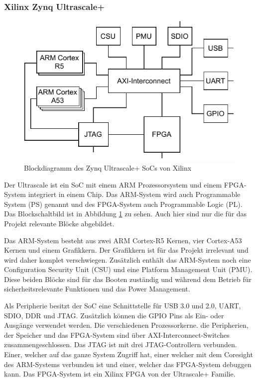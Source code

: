 \documentclass{article}
\begin{document}
\subsubsection*{Xilinx Zynq Ultrascale+}
\begin{figure}[tb]
    \includegraphics[width=\linewidth]{drawio/bd_soc}
    \caption{Blockdiagramm des Zynq Ultrascale+ SoCs von Xilinx}
    \label{fig:bd_soc}
\end{figure}

Der Ultrascale ist ein SoC mit einem ARM Prozessorsystem und einem FPGA-System integriert in einem Chip. Das ARM-System wird auch Programmable System (PS) genannt und des FPGA-System auch Programmable Logic (PL). Das Blockschaltbild ist in Abbildung \ref{fig:bd_soc} zu sehen. Auch hier sind nur die für das Projekt relevante Blöcke abgebildet. 

Das ARM-System besteht aus zwei ARM Cortex-R5 Kernen, vier Cortex-A53 Kernen und einem Grafikkern. Der Grafikkern ist für das Projekt irrelevant und wird daher komplet verschwiegen. Zusätzlich enthält das ARM-System noch eine Configuration Security Unit (CSU) und eine Platform Management Unit (PMU). Diese beiden Blöcke sind für das Booten zuständig und während dem Betrieb für sicherheitsrelevante Funktionen und das Power Management.

Als Peripherie besitzt der SoC eine Schnittstelle für USB 3.0 und 2.0, UART, SDIO, DDR und JTAG. Zusätzlich können die GPIO Pins als Ein- oder Ausgänge verwendet werden. Die verschiedenen Prozessorkerne. die Peripherien, der Speicher und das FPGA-System sind über AXI-Interconnect-Switches zusammengeschlossen. Das JTAG ist mit drei JTAG-Controllern verbunden. Einer, welcher auf das ganze System Zugriff hat, einer welcher mit dem Coresight des ARM-Systems verbunden ist und einer, welcher das FPGA-System debuggen kann. Das FPGA-System ist ein Xilinx FPGA von der Ultrascale+ Familie. 
\end{document}
